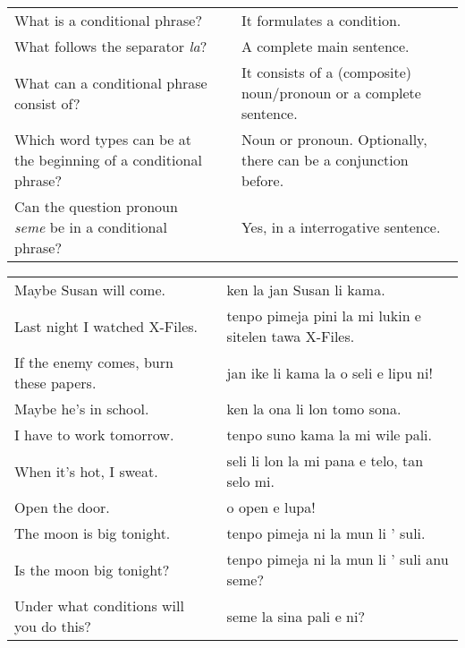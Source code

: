 
\begin{supertabular}{p{5,5cm}|ll}
What is a conditional phrase? && It formulates a condition. \\  %
What follows the separator \textit{la}? && A complete main sentence.  \\  %
What can a conditional phrase consist of?  && It consists of a (composite) noun/pronoun or a complete sentence. \\  %
Which word types can be at the beginning of a conditional phrase? && Noun or pronoun. Optionally, there can be a conjunction before. \\  %
Can the question pronoun \textit{seme} be in a conditional phrase? && Yes, in a interrogative sentence.  \\  %
\end{supertabular}

\begin{supertabular}{p{5,5cm}|ll}
Maybe Susan will come.  && ken la jan Susan li kama. \\ %
Last night I watched X-Files.  && tenpo pimeja pini la mi lukin e sitelen tawa X-Files. \\ %
If the enemy comes, burn these papers.  && jan ike li kama la o seli e lipu ni! \\ %
Maybe he's in school.  && ken la ona li lon tomo sona. \\ %
I have to work tomorrow.  && tenpo suno kama la mi wile pali. \\ %
When it's hot, I sweat.  && seli li lon la mi pana e telo, tan selo mi. \\ %
Open the door.  && o open e lupa! \\ %
The moon is big tonight.  && tenpo pimeja ni la mun li ' suli. \\ %
Is the moon big tonight?  && tenpo pimeja ni la mun li ' suli anu seme? \\ %
Under what conditions will you do this? && seme la sina pali e ni? \\ %
\end{supertabular}  

